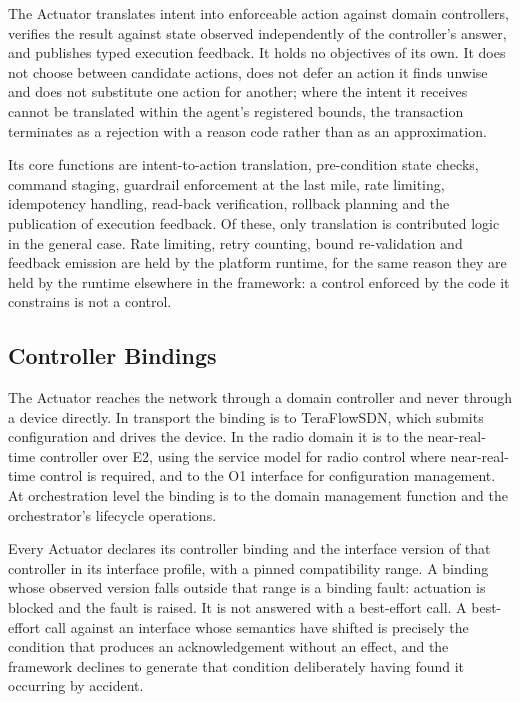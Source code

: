 The Actuator translates intent into enforceable action against domain
controllers, verifies the result against state observed independently of
the controller's answer, and publishes typed execution feedback. It
holds no objectives of its own. It does not choose between candidate
actions, does not defer an action it finds unwise and does not
substitute one action for another; where the intent it receives cannot
be translated within the agent's registered bounds, the transaction
terminates as a rejection with a reason code rather than as an
approximation.

Its core functions are intent-to-action translation, pre-condition state
checks, command staging, guardrail enforcement at the last mile, rate
limiting, idempotency handling, read-back verification, rollback
planning and the publication of execution feedback. Of these, only
translation is contributed logic in the general case. Rate limiting,
retry counting, bound re-validation and feedback emission are held by
the platform runtime, for the same reason they are held by the runtime
elsewhere in the framework: a control enforced by the code it constrains
is not a control.

\hypertarget{controller-bindings}{%
\subsection{Controller Bindings}\label{controller-bindings}}

The Actuator reaches the network through a domain controller and never
through a device directly. In transport the binding is to TeraFlowSDN,
which submits configuration and drives the device. In the radio domain
it is to the near-real-time controller over E2, using the service model
for radio control where near-real-time control is required, and to the
O1 interface for configuration management. At orchestration level the
binding is to the domain management function and the orchestrator's
lifecycle operations.

Every Actuator declares its controller binding and the interface version
of that controller in its interface profile, with a pinned compatibility
range. A binding whose observed version falls outside that range is a
binding fault: actuation is blocked and the fault is raised. It is not
answered with a best-effort call. A best-effort call against an
interface whose semantics have shifted is precisely the condition that
produces an acknowledgement without an effect, and the framework
declines to generate that condition deliberately having found it
occurring by accident.

